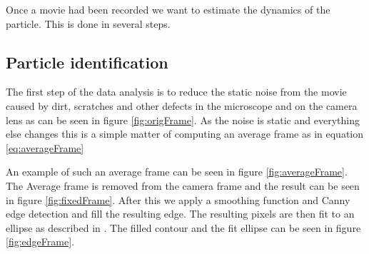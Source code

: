 Once a movie had been recorded we want to estimate the dynamics of the particle. This is done in several steps. 

\subsection{Particle identification}\label{sec:particleidentification}

The first step of the data analysis is to reduce the static noise from the movie caused by dirt, scratches and other defects in the microscope and on the camera lens as can be seen in figure \ref{fig:origFrame}. As the noise is static and everything else changes this is a simple matter of computing an average frame as in equation \ref{eq:averageFrame}

An example of such an average frame can be seen in figure \ref{fig:averageFrame}. The Average frame is removed from the camera frame and the result can be seen in figure \ref{fig:fixedFrame}. After this we apply a smoothing function and Canny edge detection \cite{Canny} and fill the resulting edge. The resulting pixels are then fit to an ellipse as 
described in \cite{AntonThesis, EllipseFit}. The filled contour and the fit ellipse can be seen in figure 
\ref{fig:edgeFrame}.

